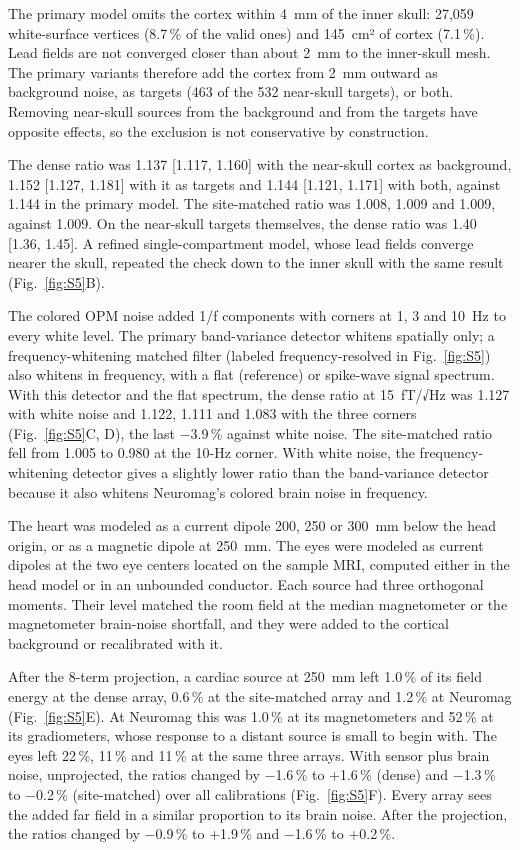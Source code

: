 \documentclass[preprint,12pt,authoryear,a4paper]{elsarticle}
\begin{document}
The primary model omits the cortex within 4~mm of the inner skull: 27,059 white-surface vertices (8.7\,\% of the valid ones) and 145~cm² of cortex (7.1\,\%). Lead fields are not converged closer than about 2~mm to the inner-skull mesh. The primary variants therefore add the cortex from 2~mm outward as background noise, as targets (463 of the 532 near-skull targets), or both. Removing near-skull sources from the background and from the targets have opposite effects, so the exclusion is not conservative by construction.

The dense ratio was 1.137 [1.117, 1.160] with the near-skull cortex as background, 1.152 [1.127, 1.181] with it as targets and 1.144 [1.121, 1.171] with both, against 1.144 in the primary model. The site-matched ratio was 1.008, 1.009 and 1.009, against 1.009. On the near-skull targets themselves, the dense ratio was 1.40 [1.36, 1.45]. A refined single-compartment model, whose lead fields converge nearer the skull, repeated the check down to the inner skull with the same result (Fig.~\ref{fig:S5}B).

The colored OPM noise added 1/f components with corners at 1, 3 and 10~Hz to every white level. The primary band-variance detector whitens spatially only; a frequency-whitening matched filter (labeled frequency-resolved in Fig.~\ref{fig:S5}) also whitens in frequency, with a flat (reference) or spike-wave signal spectrum. With this detector and the flat spectrum, the dense ratio at 15~fT/√Hz was 1.127 with white noise and 1.122, 1.111 and 1.083 with the three corners (Fig.~\ref{fig:S5}C, D), the last −3.9\,\% against white noise. The site-matched ratio fell from 1.005 to 0.980 at the 10-Hz corner. With white noise, the frequency-whitening detector gives a slightly lower ratio than the band-variance detector because it also whitens Neuromag's colored brain noise in frequency.

The heart was modeled as a current dipole 200, 250 or 300~mm below the head origin, or as a magnetic dipole at 250~mm. The eyes were modeled as current dipoles at the two eye centers located on the sample MRI, computed either in the head model or in an unbounded conductor. Each source had three orthogonal moments. Their level matched the room field at the median magnetometer or the magnetometer brain-noise shortfall, and they were added to the cortical background or recalibrated with it.

After the 8-term projection, a cardiac source at 250~mm left 1.0\,\% of its field energy at the dense array, 0.6\,\% at the site-matched array and 1.2\,\% at Neuromag (Fig.~\ref{fig:S5}E). At Neuromag this was 1.0\,\% at its magnetometers and 52\,\% at its gradiometers, whose response to a distant source is small to begin with. The eyes left 22\,\%, 11\,\% and 11\,\% at the same three arrays. With sensor plus brain noise, unprojected, the ratios changed by −1.6\,\% to +1.6\,\% (dense) and −1.3\,\% to −0.2\,\% (site-matched) over all calibrations (Fig.~\ref{fig:S5}F). Every array sees the added far field in a similar proportion to its brain noise. After the projection, the ratios changed by −0.9\,\% to +1.9\,\% and −1.6\,\% to +0.2\,\%.
\end{document}
